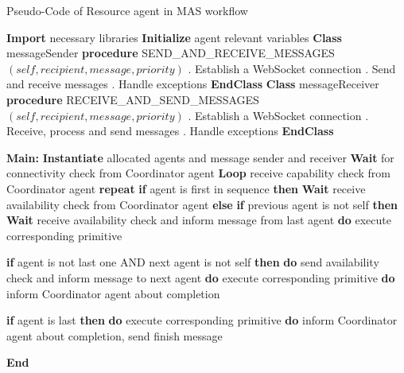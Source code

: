 \begin{algorithm}
    \caption{Pseudo-Code of Resource agent in MAS workflow}
    \label{alg:RAPseudoCode}
    \begin{algorithmic}
    \State \textbf{Import} necessary libraries
    \State \textbf{Initialize} agent relevant variables
    \State \qquad
    \State \textbf{Class} messageSender
    \State \textbf{\qquad procedure} {SEND\_AND\_RECEIVE\_MESSAGES$(self, recipient, message, priority)$}
    \State \qquad {}. Establish a WebSocket connection
    \State \qquad {}. Send and receive messages
    \State \qquad {}. Handle exceptions
\State \textbf{EndClass}
\State \qquad
\State \textbf{Class} messageReceiver
    \State \textbf{\qquad procedure} {RECEIVE\_AND\_SEND\_MESSAGES$(self, recipient, message, priority)$}
    \State \qquad {}. Establish a WebSocket connection
    \State \qquad {}. Receive, process and send messages
    \State \qquad {}. Handle exceptions
\State \textbf{EndClass}
\State \qquad

    
    \State \textbf{Main:}
    \State \textbf{\qquad Instantiate} allocated agents and message sender and receiver
    \State \textbf{\qquad Wait} for connectivity check from Coordinator agent
    \State \textbf{\qquad Loop} receive capability check from Coordinator agent
    \State \textbf{\qquad repeat}
    \State \textbf{\qquad \qquad if} {agent is first in sequence} \textbf{then}
        \State \textbf{\qquad \qquad \qquad Wait} receive availability check from Coordinator agent
        \State \textbf{\qquad \qquad else}
        \State \textbf{\qquad \qquad \qquad if} {previous agent is not self} \textbf{then}
            \State \textbf{\qquad \qquad \qquad Wait} receive availability check and inform message from last agent
            \State \textbf{\qquad \qquad \qquad do} execute corresponding primitive
        
            \State \textbf{\qquad \qquad \qquad if} {agent is not last one AND next agent is not self} \textbf{then}
            \State \textbf{\qquad \qquad \qquad \qquad do} send availability check and inform message to next agent
            \State \textbf{\qquad \qquad \qquad \qquad do} execute corresponding primitive
            \State \textbf{\qquad \qquad \qquad \qquad do} inform Coordinator agent about completion
         
            \State \textbf{\qquad \qquad \qquad if} {agent is last} \textbf{then}
            \State \textbf{\qquad \qquad \qquad \qquad do} execute corresponding primitive
            \State \textbf{\qquad \qquad \qquad \qquad do} inform Coordinator agent about completion, send finish message
    
    \State \textbf{\qquad End} 
    \end{algorithmic}
    \end{algorithm}

